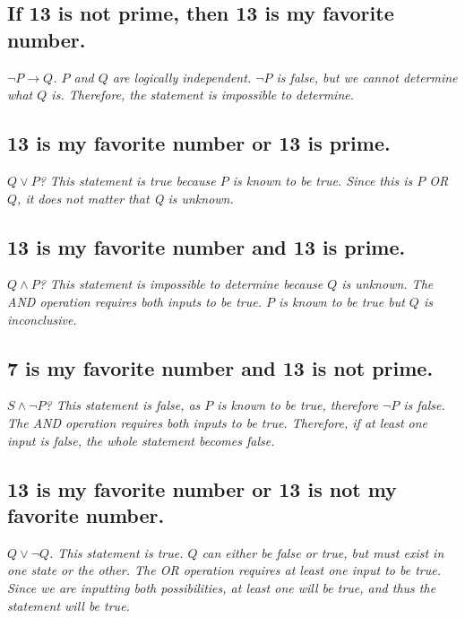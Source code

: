 \documentclass{article}
\begin{document}
\subsection{If 13 is not prime, then 13 is my favorite number.}
\hspace{1cm}\textit{$\neg P \xrightarrow{} Q$. $P$ and $Q$ are logically independent. $\neg P$ is false, but we cannot determine what $Q$ is. Therefore, the statement is impossible to determine.}
\subsection{13 is my favorite number or 13 is prime.}
\hspace{1cm}\textit{$Q \lor P$? This statement is true because $P$ is known to be true. Since this is $P$ OR $Q$, it does not matter that Q is unknown.}
\subsection{13 is my favorite number and 13 is prime.}
\hspace{1cm}\textit{$Q \land P$? This statement is impossible to determine because $Q$ is unknown. The AND operation requires both inputs to be true. $P$ is known to be true but $Q$ is inconclusive.}
\subsection{7 is my favorite number and 13 is not prime.}
\hspace{1cm}\textit{$S \land \neg P$? This statement is false, as $P$ is known to be true, therefore $\neg P$ is false. The AND operation requires both inputs to be true. Therefore, if at least one input is false, the whole statement becomes false.}
\subsection{13 is my favorite number or 13 is not my favorite number.}
\hspace{1cm}\textit{$Q \lor \neg Q$. This statement is true. $Q$ can either be false or true, but must exist in one state or the other. The OR operation requires at least one input to be true. Since we are inputting both possibilities, at least one will be true, and thus the statement will be true.}

\end{document}
